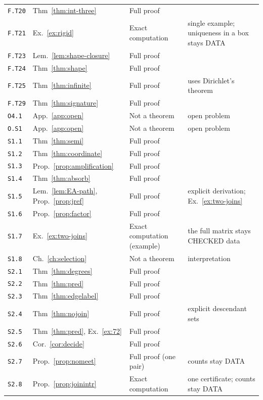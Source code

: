 \documentclass[11pt,oneside,openany]{book}
\theoremstyle{definition}
\theoremstyle{remark}
\begin{document}
\begin{longtable}{@{}p{15mm}p{33mm}p{36mm}p{36mm}@{}}
\texttt{F.T20} & Thm~\ref{thm:int-three} & Full proof &  \\
\texttt{F.T21} & Ex.~\ref{ex:rigid} & Exact computation & single example; uniqueness in a box stays DATA \\
\texttt{F.T23} & Lem.~\ref{lem:shape-closure} & Full proof &  \\
\texttt{F.T24} & Thm~\ref{thm:shape} & Full proof & \\
\texttt{F.T25} & Thm~\ref{thm:infinite} & Full proof & uses Dirichlet's theorem \\
\texttt{F.T29} & Thm~\ref{thm:signature} & Full proof &  \\
\texttt{O4.1} & App.~\ref{app:open} & Not a theorem & open problem \\
\texttt{O.S1} & App.~\ref{app:open} & Not a theorem & open problem \\
\texttt{S1.1} & Thm~\ref{thm:semi} & Full proof &  \\
\texttt{S1.2} & Thm~\ref{thm:coordinate} & Full proof &  \\
\texttt{S1.3} & Prop.~\ref{prop:amplification} & Full proof &  \\
\texttt{S1.4} & Thm~\ref{thm:absorb} & Full proof &  \\
\texttt{S1.5} & Lem.~\ref{lem:EA-path}, Prop.~\ref{prop:jref} & Full proof & explicit derivation; Ex.~\ref{ex:two-joins} \\
\texttt{S1.6} & Prop.~\ref{prop:factor} & Full proof &  \\
\texttt{S1.7} & Ex.~\ref{ex:two-joins} & Exact computation (example) & the full matrix stays CHECKED data \\
\texttt{S1.8} & Ch.~\ref{ch:selection} & Not a theorem & interpretation \\
\texttt{S2.1} & Thm~\ref{thm:degrees} & Full proof &  \\
\texttt{S2.2} & Thm~\ref{thm:pred} & Full proof &  \\
\texttt{S2.3} & Thm~\ref{thm:edgelabel} & Full proof &  \\
\texttt{S2.4} & Thm~\ref{thm:nojoin} & Full proof & explicit descendant sets \\
\texttt{S2.5} & Thm~\ref{thm:pred}, Ex.~\ref{ex:72} & Full proof &  \\
\texttt{S2.6} & Cor.~\ref{cor:decide} & Full proof & \\
\texttt{S2.7} & Prop.~\ref{prop:nomeet} & Full proof (one pair) & counts stay DATA \\
\texttt{S2.8} & Prop.~\ref{prop:joinintr} & Exact computation & one certificate; counts stay DATA \\

\end{longtable}
\end{document}
